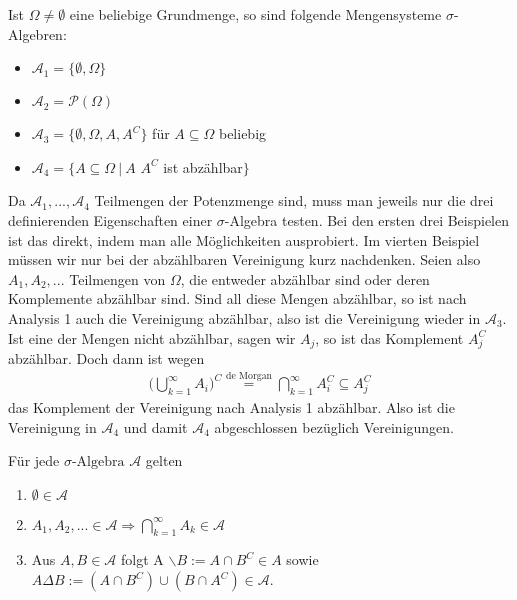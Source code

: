 \begin{example}
Ist $\Omega\neq \emptyset$ eine beliebige Grundmenge, so sind folgende Mengensysteme $\sigma$-Algebren:
\label{E1} \abs
\begin{itemize}
	\item $\mathcal{A}_1= \{ \emptyset, \Omega \}$
	\item $\mathcal A_2=\mathcal P(\Omega)$
	\item $\mathcal{A}_3 = \{ \emptyset, \Omega, A, A^C \}$ für $A \subseteq \Omega$ beliebig
	\item $\mathcal{A}_4 = \{ A \subseteq \Omega \: | \: A$  $A^C $ ist abzählbar$\}$
\end{itemize}
Da $\mathcal A_1,...,\mathcal A_4$ Teilmengen der Potenzmenge sind, muss man jeweils nur die drei definierenden Eigenschaften einer $\sigma$-Algebra testen. Bei den ersten drei Beispielen ist das direkt, indem man alle M\"oglichkeiten ausprobiert. Im vierten Beispiel m\"ussen wir nur bei der abz\"ahlbaren Vereinigung kurz nachdenken. Seien also $A_1, A_2, ...$ Teilmengen von $\Omega$, die entweder abz\"ahlbar sind oder deren Komplemente abz\"ahlbar sind. Sind all diese Mengen abz\"ahlbar, so ist nach Analysis 1 auch die Vereinigung abz\"ahlbar, also ist die Vereinigung wieder in $\mathcal A_3$. Ist eine der Mengen nicht abz\"ahlbar, sagen wir $A_j$, so ist das Komplement $A_j^C$ abz\"ahlbar. Doch dann ist wegen
\begin{align*}
	\Big(\bigcup_{k=1}^\infty A_i\Big)^C \overset{\text{de Morgan}}{=}  \bigcap_{k=1}^\infty A_i^C \subseteq A_j^C
\end{align*}
das Komplement der Vereinigung nach Analysis 1 abz\"ahlbar. Also ist die Vereinigung in $\mathcal A_4$ und damit $\mathcal A_4$ abgeschlossen bez\"uglich Vereinigungen.
\end{example}
\begin{laussagewerkzeug}
\begin{lemma}\label{gd}
Für jede $\sigma\text{-Algebra}$ $\mathcal{A}$ gelten
\begin{enumerate}[label=(\roman*)]
	\item $\emptyset \in \mathcal{A}$
	\item $A_{1}, A_{2},... \in \mathcal{A} \Rightarrow \bigcap\limits_{k=1}^{\infty} A_{k} \in \mathcal{A}$
	\item Aus $A, B \in \mathcal{A}$ folgt A $\backslash B := A \cap B^C \in A$ sowie $A \Delta B := (A\cap B^C) \cup (B \cap A^C) \in  \mathcal A$.
\end{enumerate}
\end{lemma}
\end{laussagewerkzeug}

